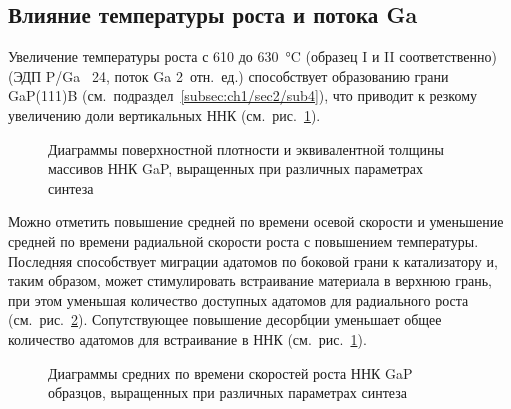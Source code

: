 \subsection{Влияние температуры роста и потока Ga}\label{subsec:ch6/sec2/sub3}

Увеличение температуры роста с 610 до 630~\si{\degreeCelsius} (образец I и II соответственно) (ЭДП P/Ga ~24, поток Ga 2~отн.~ед.) способствует образованию грани GaP(111)B (см.~подраздел~\cref{subsec:ch1/sec2/sub4}), что приводит к резкому увеличению доли вертикальных ННК (см.~рис.~\cref{fig:Image_42_1}).

\begin{figure}[ht]
	\caption{Диаграммы поверхностной плотности и эквивалентной толщины массивов ННК GaP, выращенных при различных параметрах синтеза}\label{fig:Image_42_1}
\end{figure}

Можно отметить повышение средней по времени осевой скорости и уменьшение средней по времени радиальной скорости роста с повышением температуры. Последняя способствует миграции адатомов по боковой грани к катализатору и, таким образом, может стимулировать встраивание материала в верхнюю грань, при этом уменьшая количество доступных адатомов для радиального роста (см.~рис.~\cref{fig:Image_42_2}). Сопутствующее повышение десорбции уменьшает общее количество адатомов для встраивание в ННК (см.~рис.~\cref{fig:Image_42_1}).

\begin{figure}[ht]
	\caption{Диаграммы средних по времени скоростей роста ННК GaP образцов, выращенных при различных параметрах синтеза}\label{fig:Image_42_2}
\end{figure}

